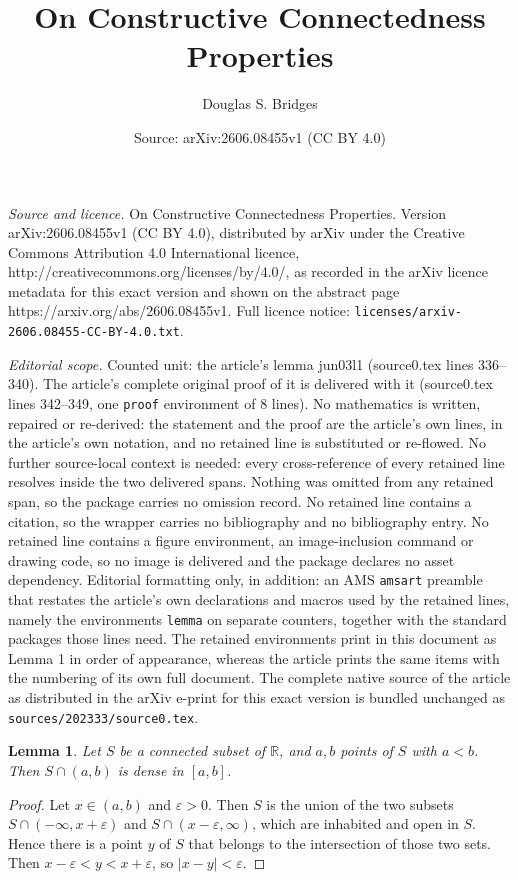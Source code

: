 \documentclass[10pt,a4paper]{amsart}
\title{On \textsf{Constructive Connectedness Properties}}
\author{Douglas S. Bridges}
\date{Source: arXiv:2606.08455v1 (CC BY 4.0)}
\newtheorem{lemma}{Lemma}
\begin{document}
\maketitle

\noindent\emph{Source and licence.} On \textsf{Constructive Connectedness Properties}. Version arXiv:2606.08455v1 (CC BY 4.0), distributed by arXiv under the Creative Commons Attribution 4.0 International licence, http://creativecommons.org/licenses/by/4.0/, as recorded in the arXiv licence metadata for this exact version and shown on the abstract page https://arxiv.org/abs/2606.08455v1. Full licence notice: \texttt{licenses/arxiv-2606.08455-CC-BY-4.0.txt}.\par\smallskip

\noindent\textit{Editorial scope.} Counted unit: the article's lemma jun03l1 (source0.tex lines 336--340). The article's complete original proof of it is delivered with it (source0.tex lines 342--349, one \texttt{proof} environment of 8 lines). No mathematics is written, repaired or re-derived: the statement and the proof are the article's own lines, in the article's own notation, and no retained line is substituted or re-flowed.  No further source-local context is needed: every cross-reference of every retained line resolves inside the two delivered spans.  Nothing was omitted from any retained span, so the package carries no omission record.  No retained line contains a citation, so the wrapper carries no bibliography and no bibliography entry.  No retained line contains a figure environment, an image-inclusion command or drawing code, so no image is delivered and the package declares no asset dependency.  Editorial formatting only, in addition: an AMS \texttt{amsart} preamble that restates the article's own declarations and macros used by the retained lines, namely the environments \texttt{lemma} on separate counters, together with the standard packages those lines need.  The retained environments print in this document as Lemma 1 in order of appearance, whereas the article prints the same items with the numbering of its own full document.  The complete native source of the article as distributed in the arXiv e-print for this exact version is bundled unchanged as \texttt{sources/202333/source0.tex}.
\begin{lemma}
\label{jun03l1}Let $S$ be a connected subset of $\mathbb{R}$, and $a,b$ points
of $S$ with $a<b$. Then $S\cap\left(  a,b\right)  $ is dense in $\left[
a,b\right]  $.
\end{lemma}

\begin{proof}
Let $x\in\left(  a,b\right)  $ and $\varepsilon>0$. Then $S$ is the union of
the two subsets $S\cap(-\infty,x+\varepsilon)$ and $S\cap\left(
x-\varepsilon,\infty\right)  $, which are inhabited and open in $S$. Hence
there is a point $y$ of $S$ that belongs to the intersection of those two
sets. Then $x-\varepsilon<y<x+\varepsilon$, so $\left\vert x-y\right\vert
<\varepsilon$.
\end{proof}%
\end{document}
